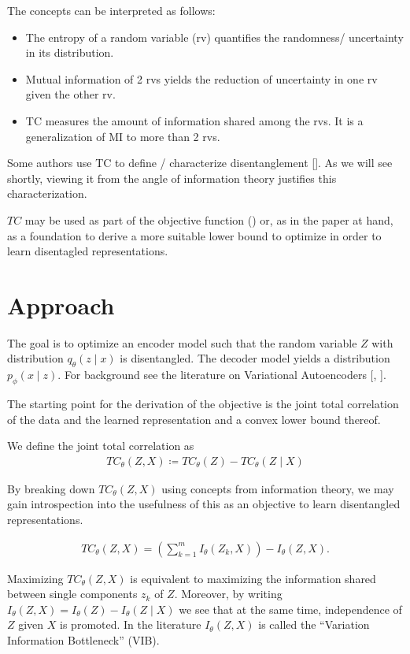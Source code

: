 \documentclass[twoside,11pt]{article}
\begin{document}
\begin{remark}[Interpretation]
  The concepts can be interpreted as follows:
  \begin{itemize}
    \item The entropy of a random variable (rv) quantifies the randomness/ uncertainty in its distribution.
    \item Mutual information of 2 rvs yields the reduction of uncertainty in one rv given the other rv.
    \item TC measures the amount of information shared among the rvs. It is a generalization of MI to more than 2 rvs.
  \end{itemize}
\end{remark}

 Some authors use TC to define / characterize disentanglement [\cite{achille2018emergence}]. As we will see shortly, viewing it from the angle of information theory justifies this characterization.

$TC$ may be used as part of the objective function (\cite{FactorVAE}) or, as in the paper at hand, as a foundation to derive a more suitable lower bound to optimize in order to learn disentagled representations.

\section{Approach}
The goal is to optimize an encoder model such that the random variable $Z$ with distribution $q_{\theta}(z \mid x)$ is disentangled. The decoder model yields a distribution $p_{\phi}(x \mid z)$. For background see the literature on Variational Autoencoders [\cite{VAE_foundational}, \cite{VAE_explained}].

The starting point for the derivation of the objective is the joint total correlation of the data and the learned representation and a convex lower bound thereof.
\begin{definition}
  We define the joint total correlation as
  \begin{align*}
    TC_{\theta}(Z, X) \coloneqq TC_{\theta}(Z) - TC_{\theta}(Z \mid X)
  \end{align*}
\end{definition}
By breaking down $TC_{\theta}(Z, X)$ using concepts from information theory, we may gain introspection into the usefulness of this as an objective to learn disentangled representations.


\begin{proposition}
  \begin{align*}
    TC_{\theta}(Z, X) = (\sum_{k=1}^{m}I_{\theta}(Z_{k}, X)) - I_{\theta}(Z,X).
  \end{align*}
\end{proposition}
Maximizing $TC_{\theta}(Z,X)$ is equivalent to maximizing the information shared between single components $z_{k}$ of $Z$.
Moreover, by writing $I_{\theta}(Z,X) = I_{\theta}(Z) - I_{\theta}(Z \mid X)$ we see that at the same time, independence of $Z$ given $X$ is promoted.
In the literature $I_{\theta}(Z,X)$ is called the \enquote{Variation Information Bottleneck} (VIB).
\end{document}
